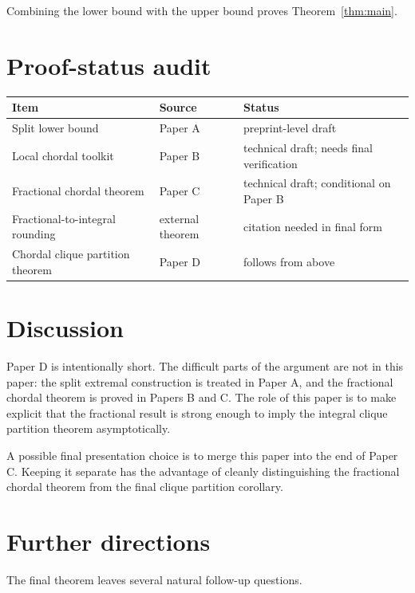 \documentclass[11pt]{article}
\theoremstyle{definition}
\begin{document}
Combining the lower bound with the upper bound proves Theorem~\ref{thm:main}.

\section{Proof-status audit}

\begin{center}
\begin{tabular}{lll}
\toprule
Item & Source & Status\\
\midrule
Split lower bound & Paper A & preprint-level draft\\
Local chordal toolkit & Paper B & technical draft; needs final verification\\
Fractional chordal theorem & Paper C & technical draft; conditional on Paper B\\
Fractional-to-integral rounding & external theorem & citation needed in final form\\
Chordal clique partition theorem & Paper D & follows from above\\
\bottomrule
\end{tabular}
\end{center}

\section{Discussion}

Paper D is intentionally short. The difficult parts of the argument are not in this paper: the split extremal construction is treated in Paper A, and the fractional chordal theorem is proved in Papers B and C. The role of this paper is to make explicit that the fractional result is strong enough to imply the integral clique partition theorem asymptotically.

A possible final presentation choice is to merge this paper into the end of Paper C. Keeping it separate has the advantage of cleanly distinguishing the fractional chordal theorem from the final clique partition corollary.


\section{Further directions}

The final theorem leaves several natural follow-up questions.
\end{document}
